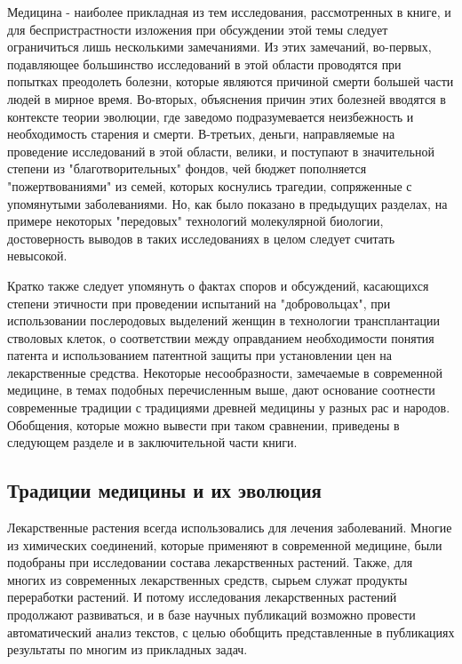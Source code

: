 Медицина - наиболее прикладная из тем исследования, рассмотренных в книге, и для беспристрастности изложения при обсуждении этой темы следует ограничиться лишь несколькими замечаниями. Из этих замечаний, во-первых, подавляющее большинство исследований в этой области проводятся при попытках преодолеть болезни, которые являются причиной смерти большей части людей в мирное время. Во-вторых, объяснения причин этих болезней вводятся в контексте теории эволюции, где заведомо подразумевается неизбежность и необходимость старения и смерти. В-третьих, деньги, направляемые на проведение исследований в этой области, велики, и поступают в значительной степени из "благотворительных" фондов, чей бюджет пополняется "пожертвованиями" из семей, которых коснулись трагедии, сопряженные с упомянутыми заболеваниями. Но, как было показано в предыдущих разделах, на примере некоторых "передовых" технологий молекулярной биологии, достоверность выводов в таких исследованиях в целом следует считать невысокой.

Кратко также следует упомянуть о фактах споров и обсуждений, касающихся степени этичности при проведении испытаний на "добровольцах", при использовании послеродовых выделений женщин в технологии трансплантации стволовых клеток, о соответствии между оправданием необходимости понятия патента и использованием патентной защиты при установлении цен на лекарственные средства. Некоторые несообразности, замечаемые в современной медицине, в темах подобных перечисленным выше, дают основание соотнести современные традиции с традициями древней медицины у разных рас и народов. Обобщения, которые можно вывести при таком сравнении, приведены в следующем разделе и в заключительной части книги.

\subsection{Традиции медицины и их эволюция}  \label{sect_textmining_herbs}

Лекарственные растения всегда использовались для лечения заболеваний. Многие из химических соединений, которые применяют в современной медицине, были подобраны при исследовании состава лекарственных растений. Также, для многих из современных лекарственных средств, сырьем служат продукты переработки растений. И потому исследования лекарственных растений продолжают развиваться, и в базе научных публикаций возможно провести автоматический анализ текстов, с целью обобщить представленные в публикациях результаты по многим из прикладных задач.

